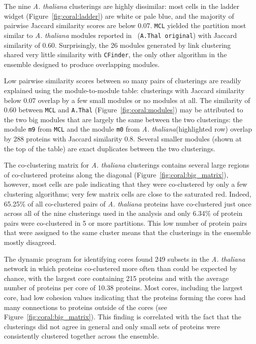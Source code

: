 \documentclass[12pt]{cmuthesis}
\newcommand{\Athal}{\textit{A. thaliana}\xspace}
\begin{document}

  The nine \Athal clusterings are highly dissimilar: most cells in the ladder widget (Figure~\ref{fig:coral:ladder}) are white or pale blue, and the majority of pairwise Jaccard similarity scores are below 0.07. \texttt{MCL} yielded the partition most similar to \Athal modules reported in~\cite{Vidal2011} (\texttt{A.Thal original}) with Jaccard similarity of 0.60. Surprisingly, the 26 modules generated by link clustering~\cite{Vidal2011} shared very little similarity with \texttt{CFinder}, the only other algorithm in the ensemble designed to produce overlapping modules.


  Low pairwise similarity scores between so many pairs of clusterings are readily explained using the module-to-module table: clusterings with Jaccard similarity below 0.07 overlap by a few small modules or no modules at all. The similarity of 0.60 between \texttt{MCL} and \texttt{A.Thal} (Figure~\ref{fig:coral:modules}) may be attributed to the two big modules that are largely the same between the two clusterings: the module \texttt{m9} from \texttt{MCL} and the module \texttt{m0} from \Athal (highlighted row) overlap by 288 proteins with Jaccard similarity 0.8. Several smaller modules (shown at the top of the table) are exact duplicates between the two clusterings.


  The co-clustering matrix for \Athal clusterings contains several large regions of co-clustered proteins along the diagonal (Figure~\ref{fig:coral:big_matrix}), however, most cells are pale indicating that they were co-clustered by only a few clustering algorithms; very few matrix cells are close to the saturated red. Indeed, 65.25\% of all co-clustered pairs of \Athal proteins have co-clustered just once across all of the nine clusterings used in the analysis and only 6.34\% of protein pairs were co-clustered in 5 or more partitions. This low number of protein pairs that were assigned to the same cluster means that the clusterings in the ensemble mostly disagreed.


  The dynamic program for identifying cores found 249 subsets in the \Athal network in which proteins co-clustered more often than could be expected by chance, with the largest core containing 215 proteins and with the average number of proteins per core of 10.38 proteins. Most cores, including the largest core, had low cohesion values indicating that the proteins forming the cores had many connections to proteins outside of the cores (see Figure~\ref{fig:coral:big_matrix}). This finding is correlated with the fact that the clusterings did not agree in general and only small sets of proteins were consistently clustered together across the ensemble.
\end{document}
